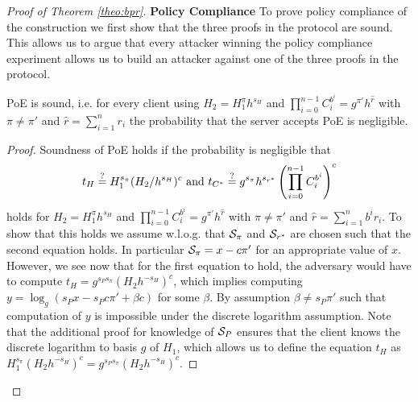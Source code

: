 \begin{proof}[Proof of Theorem \ref{theo:bpr}]
\textbf{Policy Compliance}
To prove policy compliance of the construction we first show that the three proofs in the protocol are sound.
This allows us to argue that every attacker winning the policy compliance experiment allows us to build an attacker against one of the three proofs in the protocol.

\begin{claim}
  \ac{PoE} is sound, i.e. for every client using $H_2=H_1^{\pi}h^{s_H}$ and $\prod_{i=0}^{n-1} C^{b^i}_i=g^{\pi'}h^{\hat{r}}$ with $\pi\not=\pi'$ and $\hat{r}=\sum_{i=1}^n r_i$ the probability that the server accepts \ac{PoE} is negligible.
\end{claim}

\begin{proof}
Soundness of \ac{PoE} holds if the probability is negligible that
\[ 
  t_H\stackrel{?}{=} H_1^{s_\pi}(H_2/h^{s_H})^c \text{ and } t_{C^\ast} \stackrel{?}{=} g^{s_\pi}h^{s_{r^\ast}}\left(\prod_{i=0}^{n-1} C^{b^i}_i \right)^c 
\]
holds for $H_2=H_1^{\pi}h^{s_H}$ and $\prod_{i=0}^{n-1} C^{b^i}_i=g^{\pi'}h^{\hat{r}}$ with $\pi\not=\pi'$ and $\hat{r}=\sum_{i=1}^n b^i r_i$.
To show that this holds we assume w.l.o.g. that $\mathcal{S}_\pi$ and $\mathcal{S}_{r^\ast}$ are chosen such that the second equation holds.
In particular $\mathcal{S}_\pi=x-c\pi'$ for an appropriate value of $x$.
However, we see now that for the first equation to hold, the adversary would have to compute $t_H=g^{s_P s_\pi}(H_2h^{-s_H})^c$, which implies computing $y=\log_g(s_P x-s_P c\pi'+\beta c)$ for some $\beta$.
By assumption $\beta\not= s_P\pi'$ such that computation of $y$ is impossible under the discrete logarithm assumption.
Note that the additional proof for knowledge of $\mathcal{S}_P$ ensures that the client knows the discrete logarithm to basis $g$ of $H_1$, which allows us to define the equation $t_H$ as $H_1^{s_\pi}(H_2h^{-s_H})^c=g^{s_P s_\pi}(H_2h^{-s_H})^c$.

\end{proof}


\end{proof}
